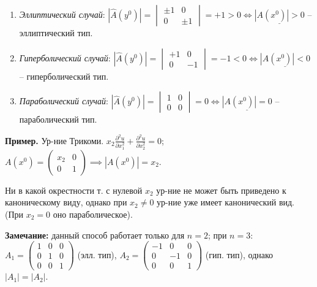 \documentclass[12pt, a4paper]{article}
\begin{document}
\begin{enumerate}
    \item \textit{Эллиптический случай}: $|\hat{A}(y^0)| = \begin{vmatrix} \pm 1 & 0 \\ 0 & \pm 1 \end{vmatrix} = +1 > 0 \iff \underline{|A(x^0)| > 0}$ -- эллиптический тип.
    \item \textit{Гиперболический случай}: $|\hat{A}(y^0)| = \begin{vmatrix} +1 & 0 \\ 0 & -1 \end{vmatrix} = -1 < 0 \iff \underline{|A(x^0)| < 0}$ -- гиперболический тип.
    \item \textit{Параболический случай}: $|\hat{A}(y^0)| = \begin{vmatrix} 1 & 0 \\ 0 & 0 \end{vmatrix} = 0 \iff \underline{|A(x^0)| = 0}$ -- параболический тип.
\end{enumerate}

\textbf{Пример.} Ур-ние Трикоми.
$x_2 \frac{\partial^2 u}{\partial x_1^2} + \frac{\partial^2 u}{\partial x_2^2} = 0$; $A(x^0) = \begin{pmatrix} x_2 & 0 \\ 0 & 1 \end{pmatrix} \implies |A(x^0)| = x_2$.



Ни в какой окрестности т. с нулевой $x_2$ ур-ние не может быть приведено к каноническому виду, однако при $x_2 \ne 0$ ур-ние уже имеет канонический вид. (При $x_2=0$ оно параболическое).

\textbf{Замечание:} данный способ работает только для $n=2$; при $n=3$:
$A_1 = \begin{pmatrix} 1 & 0 & 0 \\ 0 & 1 & 0 \\ 0 & 0 & 1 \end{pmatrix}$ (элл. тип), $A_2 = \begin{pmatrix} -1 & 0 & 0 \\ 0 & -1 & 0 \\ 0 & 0 & 1 \end{pmatrix}$ (гип. тип),
однако $|A_1| = |A_2|$.
\end{document}
